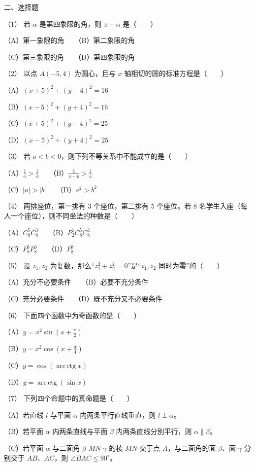 \begin{question}

二、选择题

（1） 若 $\alpha$ 是第四象限的角，则 $\pi-\alpha$ 是\mbox{（　　）}

（A）第一象限的角　　（B）第二象限的角

（C）第三象限的角　　（D）第四象限的角

（2） 以点 $A(-5,4)$ 为圆心，且与 $x$ 轴相切的圆的标准方程是\mbox{（　　）}

（A）$(x+5)^2+(y-4)^2=16$

（B）$(x-5)^2+(y+4)^2=16$

（C）$(x+5)^2+(y-4)^2=25$

（D）$(x-5)^2+(y+4)^2=25$

（3） 若 $a<b<0$，则下列不等关系中不能成立的是\mbox{（　　）}

（A）$\frac1a>\frac1b$　　（B）$\frac1{a-b}>\frac1a$

（C）$|a|>|b|$　　（D）$a^2>b^2$

（4） 两排座位，第一排有 3 个座位，第二排有 5 个座位。若 8 名学生入座（每人一个座位），则不同坐法的种数是\mbox{（　　）}

（A）$C_8^5C_8^3$　　（B）$P_2^1C_8^5C_8^3$

（C）$P_8^5P_8^3$　　（D）$P_8^8$

（5） 设 $z_1,z_2$ 为复数，那么“$z_1^2+z_2^2=0$”是“$z_1,z_2$ 同时为零”的\mbox{（　　）}

（A）充分不必要条件　　（B）必要不充分条件

（C）充分必要条件　　（D）既不充分又不必要条件

（6） 下面四个函数中为奇函数的是\mbox{（　　）}

（A）$y=x^2\sin\left(x+\frac\pi2\right)$

（B）$y=x^2\cos\left(x+\frac\pi4\right)$

（C）$y=\cos(\operatorname{arc\,ctg}x)$

（D）$y=\operatorname{arc\,ctg}(\sin x)$

（7） 下列四个命题中的真命题是\mbox{（　　）}

（A）若直线 $l$ 与平面 $\alpha$ 内两条平行直线垂直，则 $l\perp\alpha$。

（B）若平面 $\alpha$ 内两条直线与平面 $\beta$ 内两条直线分别平行，则 $\alpha\parallel\beta$。

（C）若平面 $\alpha$ 与二面角 $\beta$-$MN$-$\gamma$ 的棱 $MN$ 交于点 $A$，与二面角的面 $\beta$、面 $\gamma$ 分别交于 $AB$、$AC$，则 $\angle BAC\le90^\circ$。


\end{question}
